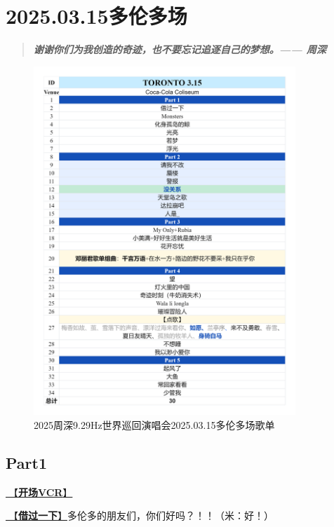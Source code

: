 \documentclass[]{ctexbook}
\begin{document}
\chapter{2025.03.15多伦多场}\label{Toronto-20250315}

\begin{quote}
\textbf{\emph{谢谢你们为我创造的奇迹，也不要忘记追逐自己的梦想。------ 周深}}
\end{quote}

\begin{figure}

{\centering \includegraphics[width=280pt]{img/playlists/playlists-toronto-20250315} 

}

\caption{2025周深9.29Hz世界巡回演唱会2025.03.15多伦多场歌单}\label{fig:unnamed-chunk-38}
\end{figure}

\newpage

\section{Part1}\label{Toronto-20250315-part1}

\hyperref[opening-vcr]{🎥【\textbf{开场VCR}】}

\hyperref[I-will-go-my-way]{🎵【\textbf{借过一下}】}多伦多的朋友们，你们好吗？！！（米：好！）
\end{document}
